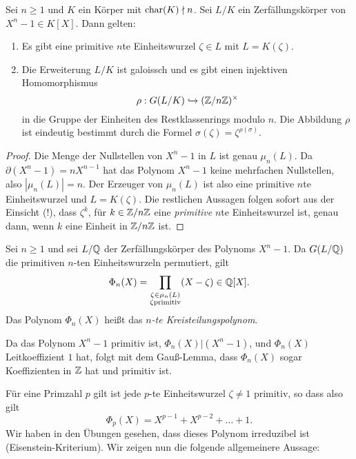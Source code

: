 \documentclass{book}
\begin{document}
\begin{prop}
    \label{prop:galoisew}
    Sei $n \ge 1$ und $K$ ein Körper mit $\operatorname{char}(K) \nmid n$. Sei $L/K$ ein Zerfällungskörper von $X^n -1 \in K[X]$. Dann gelten:
    \begin{enumerate}
        \item Es gibt eine primitive $n$te Einheitswurzel $\zeta \in L$ mit $L = K(\zeta)$. 
        \item Die Erweiterung $L/K$ ist galoissch und es gibt einen injektiven Homomorphismus
            \[
                \rho: G(L/K) \hookrightarrow (\mathbb{Z}/n\mathbb{Z})^{\times}
            \]
            in die Gruppe der Einheiten des Restklassenrings modulo $n$. Die
            Abbildung $\rho$ ist eindeutig bestimmt durch die Formel
            $\sigma(\zeta) = \zeta^{\rho(\sigma)}$. 
    \end{enumerate}
\end{prop}
\begin{proof}
    Die Menge der Nullstellen von $X^n-1$ in $L$ ist genau $\mu_n(L)$. Da
    $\partial(X^n - 1) = nX^{n-1}$ hat das Polynom $X^n - 1$ keine mehrfachen
    Nullstellen, also $|\mu_n(L)| = n$. Der Erzeuger von $\mu_n(L)$ ist also
    eine primitive $n$te Einheitswurzel und $L = K(\zeta)$. Die restlichen
    Aussagen folgen sofort aus der Einsicht (!), dass $\zeta^k$, für $k \in
    \mathbb{Z}/n\mathbb{Z}$ eine {\em primitive} $n$te Einheitswurzel ist, genau dann, wenn
    $k$ eine Einheit in $\mathbb{Z}/n\mathbb{Z}$ ist. 
\end{proof}

Sei $n \ge 1$ und sei $L/\mathbb{Q}$ der Zerfällungskörper des Polynoms $X^n -1$. Da $G(L/\mathbb{Q})$ die
primitiven $n$-ten Einheitswurzeln permutiert, gilt
\[
	\Phi_n(X) = \prod_{\substack{\zeta \in \mu_n(L) \\ \zeta \text{primitiv}}} (X- \zeta) \in
	\mathbb{Q}[X].
\]
Das Polynom $\Phi_n(X)$ heißt das {\em $n$-te Kreisteilungspolynom}. 

\begin{rem} Da das Polynom $X^n -1$ primitiv ist, $\Phi_n(X)|(X^n-1)$, und $\Phi_n(X)$ Leitkoeffizient
	$1$ hat, folgt mit dem Gauß-Lemma, dass $\Phi_n(X)$ sogar Koeffizienten in $\mathbb{Z}$ hat und
	primitiv ist. 
\end{rem}

Für eine Primzahl $p$ gilt ist jede $p$-te Einheitswurzel $\zeta \ne 1$ primitiv, so dass also gilt
\[
	\Phi_p(X) = X^{p-1} + X^{p-2} + \dots + 1.
\]
Wir haben in den Übungen gesehen, dass dieses Polynom irreduzibel ist (Eisenstein-Kriterium). Wir
zeigen nun die folgende allgemeinere Aussage: 
\end{document}
